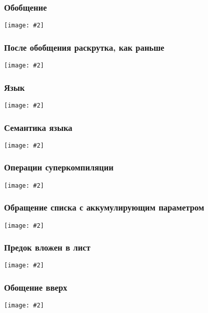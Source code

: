 \documentclass{beamer}
\newcommand{\incimage}[2][0.8]{ 
  \begin{center}   
    \texttt{[image: \#2]}
  \end{center}
  }
\begin{document}
\begin{frame}[fragile]
  \transwipe[direction=90]
  \frametitle{Обобщение}


    \incimage{applet0.png}

\end{frame}

\begin{frame}[fragile]
  \transwipe[direction=90]
  \frametitle{После обобщения раскрутка, как раньше}


    \incimage{applet1.png}

\end{frame}

\begin{frame}[fragile]
  \transwipe[direction=90]
  \frametitle{Язык}


    \incimage{lang.png}

\end{frame}


\begin{frame}[fragile]
  \transwipe[direction=90]
  \frametitle{Семантика языка}


    \incimage{normrules.png}

\end{frame}


\begin{frame}[fragile]
  \transwipe[direction=90]
  \frametitle{Операции суперкомпиляции}


    \incimage{supercompilation.png}

\end{frame}

\begin{frame}[fragile]
  \transwipe[direction=90]
  \frametitle{Обращение списка с аккумулирующим параметром}


    \incimage{revdef.png}

\end{frame}


\begin{frame}[fragile]
  \transwipe[direction=90]
  \frametitle{Предок вложен в лист}


    \incimage{revtree0.png}

\end{frame}


\begin{frame}[fragile]
  \transwipe[direction=90]
  \frametitle{Обощение вверх}


    \incimage{revtreegen0.png}

\end{frame}
\end{document}
